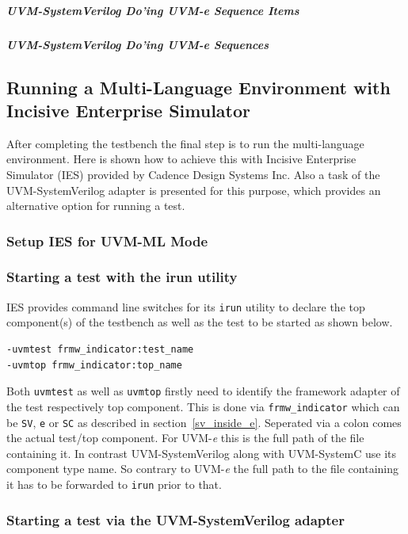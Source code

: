 \subparagraph{UVM-SystemVerilog Do'ing UVM-\textit{e} Sequence Items}
\subparagraph{UVM-SystemVerilog Do'ing UVM-\textit{e} Sequences}
\subsection{Running a Multi-Language Environment with Incisive Enterprise Simulator}

After completing the testbench the final step is to run the multi-language environment. Here is shown how to achieve
this with Incisive Enterprise Simulator (IES) provided by Cadence Design Systems Inc. Also a task of the
UVM-SystemVerilog adapter is presented for this purpose, which provides an alternative option for running a test.

\subsubsection{Setup IES for UVM-ML Mode}
\subsubsection{Starting a test with the irun utility} \label{uvm_top}

IES provides command line switches for its \lstinline$irun$ utility to declare the top component(s) of the testbench as
well as the test to be started as shown below.
\medskip
{}
\begin{lstlisting}
-uvmtest frmw_indicator:test_name
-uvmtop frmw_indicator:top_name
\end{lstlisting} 
\medskip
Both \lstinline$uvmtest$ as well as \lstinline$uvmtop$ firstly need to identify the framework adapter of the test
respectively top component. This is done via \lstinline$frmw_indicator$ which can be \lstinline$SV$, \lstinline$e$ or
\lstinline$SC$ as described in section~\ref{sv_inside_e}. Seperated via a colon comes the actual test/top component. For
UVM-\textit{e} this is the full path of the file containing it. In contrast UVM-SystemVerilog along with UVM-SystemC use
its component type name. So contrary to UVM-\textit{e} the full path to the file containing it has to be forwarded to
\lstinline$irun$ prior to that.

\subsubsection{Starting a test via the UVM-SystemVerilog adapter}

